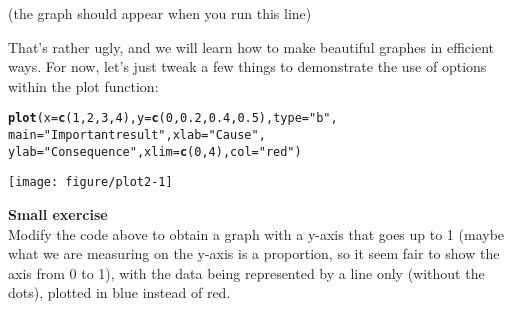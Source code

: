 \documentclass[12pt,a4paper]{scrartcl}\usepackage[]{graphicx}\usepackage[]{color}
\makeatletter
\def\maxwidth{ %
  \ifdim\Gin@nat@width>\linewidth
    \linewidth
  \else
    \Gin@nat@width
  \fi
}
\newcommand{\hlnum}[1]{\textcolor[rgb]{0.686,0.059,0.569}{#1}}%
\newcommand{\hlstr}[1]{\textcolor[rgb]{0.192,0.494,0.8}{#1}}%
\newcommand{\hlstd}[1]{\textcolor[rgb]{0.345,0.345,0.345}{#1}}%
\newcommand{\hlkwc}[1]{\textcolor[rgb]{0.333,0.667,0.333}{#1}}%
\newcommand{\hlkwd}[1]{\textcolor[rgb]{0.737,0.353,0.396}{\textbf{#1}}}%
\newenvironment{kframe}{%
 \def\at@end@of@kframe{}%
 \ifinner\ifhmode%
  \def\at@end@of@kframe{\end{minipage}}%
  \begin{minipage}{\columnwidth}%
 \fi\fi%
 \def\FrameCommand##1{\hskip\@totalleftmargin \hskip-\fboxsep
 \colorbox{shadecolor}{##1}\hskip-\fboxsep
     \hskip-\linewidth \hskip-\@totalleftmargin \hskip\columnwidth}%
 \MakeFramed {\advance\hsize-\width
   \@totalleftmargin\z@ \linewidth\hsize
   \@setminipage}}%
 {\par\unskip\endMakeFramed%
 \at@end@of@kframe}
\newenvironment{knitrout}{}{} %
\makeatother
\begin{document}
(the graph should appear when you run this line)


That's rather ugly, and we will learn how to make beautiful graphes in efficient ways. For now, let's just tweak a few things to demonstrate the use of options within the plot function:

\begin{knitrout}
\color{fgcolor}\begin{kframe}
\begin{alltt}
\hlkwd{plot}\hlstd{(}\hlkwc{x} \hlstd{=} \hlkwd{c}\hlstd{(}\hlnum{1}\hlstd{,}\hlnum{2}\hlstd{,}\hlnum{3}\hlstd{,}\hlnum{4}\hlstd{),} \hlkwc{y}\hlstd{=}\hlkwd{c}\hlstd{(}\hlnum{0}\hlstd{,}\hlnum{0.2}\hlstd{,}\hlnum{0.4}\hlstd{,}\hlnum{0.5}\hlstd{),} \hlkwc{type} \hlstd{=} \hlstr{"b"}\hlstd{,}
     \hlkwc{main} \hlstd{=} \hlstr{"Important result"}\hlstd{,} \hlkwc{xlab} \hlstd{=} \hlstr{"Cause"}\hlstd{,}
     \hlkwc{ylab} \hlstd{=} \hlstr{"Consequence"}\hlstd{,} \hlkwc{xlim} \hlstd{=} \hlkwd{c}\hlstd{(}\hlnum{0}\hlstd{,}\hlnum{4}\hlstd{),} \hlkwc{col}\hlstd{=}\hlstr{"red"}\hlstd{)}
\end{alltt}
\end{kframe}
\texttt{[image: figure/plot2-1]} 

\end{knitrout}

\begin{mdframed}
\textbf{Small exercise}\\
Modify the code above to obtain a graph with a y-axis that goes up to 1 (maybe what we are measuring on the y-axis is a proportion, so it seem fair to show the axis from 0 to 1), with the data being represented by a line only (without the dots), plotted in blue instead of red.

\end{mdframed}
\end{document}
